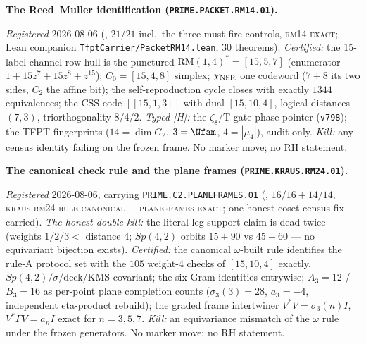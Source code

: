 \par\smallskip\noindent\textbf{The Reed--Muller identification
(\texttt{PRIME.PACKET.RM14.01}).}
{\sloppy
\emph{Registered} 2026-08-06
(, $21/21$ incl.\ the three
must-fire controls, \textsc{rm14-exact}; Lean companion
\texttt{TfptCarrier/PacketRM14.lean}, $30$ theorems).
\emph{Certified:} the 15-label channel row hull is the punctured
$\mathrm{RM}(1,4)^*=[15,5,7]$ (enumerator
$1+15z^7+15z^8+z^{15}$); $C_0=[15,4,8]$ simplex;
$\chi_{\rm NSR}$ one codeword ($7{+}8$ its two sides, $C_2$ the
affine bit); the self-reproduction cycle closes with exactly
$1344$ equivalences; the CSS code $[[15,1,3]]$ with dual
$[15,10,4]$, logical distances $(7,3)$, triorthogonality $8/4/2$.
\emph{Typed [H]:} the $\zeta_8$/T-gate phase pointer
(\texttt{v798}); the TFPT fingerprints ($14=\dim G_2$, $3=\Nfam$,
$4=|\mu_4|$), audit-only.  \emph{Kill:} any census identity
failing on the frozen frame.  No marker move; no RH
statement.\par}


\par\smallskip\noindent\textbf{The canonical check rule and the
plane frames (\texttt{PRIME.KRAUS.RM24.01}).}
{\sloppy
\emph{Registered} 2026-08-06, carrying
\texttt{PRIME.C2.PLANEFRAMES.01}
(, $16/16+14/14$,
\textsc{kraus-rm24-rule-canonical} $+$ \textsc{planeframes-exact};
one honest coset-census fix carried).  \emph{The honest double
kill:} the literal leg-support claim is dead twice (weights
$1/2/3<$ distance $4$; $Sp(4,2)$ orbits $15{+}90$ vs $45{+}60$
--- no equivariant bijection exists).  \emph{Certified:} the
canonical $\omega$-built rule identifies the rule-A protocol set
with the $105$ weight-4 checks of $[15,10,4]$ exactly,
$Sp(4,2)/\sigma$/deck/KMS-covariant; the six Gram identities
entrywise; $A_3=12$ / $B_3=16$ as per-point plane completion
counts ($\sigma_3(3)=28$, $a_3=-4$, independent eta-product
rebuild); the graded frame intertwiner $V^*V=\sigma_3(n)I$,
$V^*\Gamma V=a_nI$ exact for $n=3,5,7$.  \emph{Kill:} an
equivariance mismatch of the $\omega$ rule under the frozen
generators.  No marker move; no RH statement.\par}


